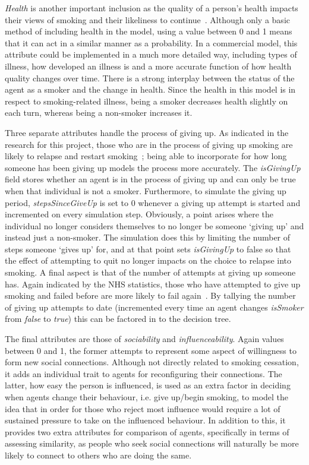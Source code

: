 \documentclass[]{report}
\begin{document}
\emph{Health} is another important inclusion as the quality of a person's health impacts their views of smoking and their likeliness to continue~\cite{NHS-43}. Although only a basic method of including health in the model, using a value between 0 and 1 means that it can act in a similar manner as a probability. In a commercial model, this attribute could be implemented in a much more detailed way, including types of illness, how developed an illness is and a more accurate function of how health quality changes over time. There is a strong interplay between the status of the agent as a smoker and the change in health. Since the health in this model is in respect to smoking-related illness, being a smoker decreases health slightly on each turn, whereas being a non-smoker increases it.

Three separate attributes handle the process of giving up. As indicated in the research for this project, those who are in the process of giving up smoking are likely to relapse and restart smoking~\cite{NHS-44}; being able to incorporate for how long someone has been giving up models the process more accurately. The \emph{isGivingUp} field stores whether an agent is in the process of giving up and can only be true when that individual is not a smoker. Furthermore, to simulate the giving up period, \emph{stepsSinceGiveUp} is set to 0 whenever a giving up attempt is started and incremented on every simulation step. Obviously, a point arises where the individual no longer considers themselves to no longer be someone `giving up' and instead just a non-smoker. The simulation does this by limiting the number of steps someone `gives up' for, and at that point sets \emph{isGivingUp} to false so that the effect of attempting to quit no longer impacts on the choice to relapse into smoking. A final aspect is that of the number of attempts at giving up someone has. Again indicated by the NHS statistics, those who have attempted to give up smoking and failed before are more likely to fail again~\cite{NHS-44}. By tallying the number of giving up attempts to date (incremented every time an agent changes \emph{isSmoker} from \emph{false} to \emph{true}) this can be factored in to the decision tree.

The final attributes are those of \emph{sociability} and \emph{influenceability}. Again values between 0 and 1, the former attempts to represent some aspect of willingness to form new social connections. Although not directly related to smoking cessation, it adds an individual trait to agents for reconfiguring their connections. The latter, how easy the person is influenced, is used as an extra factor in deciding when agents change their behaviour, i.e. give up/begin smoking, to model the idea that in order for those who reject most influence would require a lot of sustained pressure to take on the influenced behaviour. In addition to this, it provides two extra attributes for comparison of agents, specifically in terms of assessing similarity, as people who seek social connections will naturally be more likely to connect to others who are doing the same.
\end{document}
